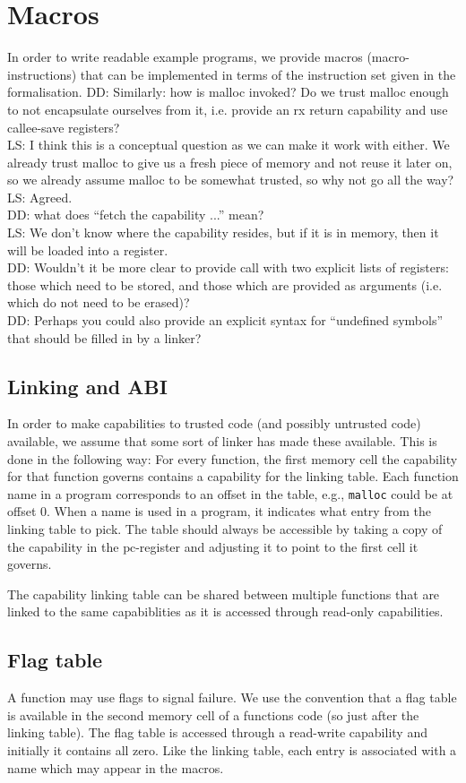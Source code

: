 \documentclass[a4paper]{article}
\newcommand\lau[1]{{\color{purple} \sf \footnotesize {LS: #1}}\\}
\newcommand\dominique[1]{{\color{purple} \sf \footnotesize {DD: #1}}\\}
\newcommand{\pcreg}{\mathrm{pc}}
\begin{document}
\section{Macros}
In order to write readable example programs, we provide macros (macro-instructions) that can be implemented in terms of the instruction set given in the formalisation.
\dominique{Similarly: how is malloc invoked?  Do we trust malloc enough to not encapsulate ourselves from it, i.e. provide an rx return capability and use callee-save registers?}
\lau{ I think this is a conceptual question as we can make it work with either. We already trust malloc to give us a fresh piece of memory and not reuse it later on, so we already assume malloc to be somewhat trusted, so why not go all the way? }
\lau{Agreed.}

\dominique{what does ``fetch the capability ...'' mean?}
\lau{ We don't know where the capability resides, but if it is in memory, then it will be loaded into a register. }
\dominique{Wouldn't it be more clear to provide call with two explicit lists of registers: those which need to be stored, and those which are provided as arguments (i.e. which do not need to be erased)?}
\dominique{Perhaps you could also provide an explicit syntax for ``undefined symbols'' that should be filled in by a linker?}

\subsection{Linking and ABI}
In order to make capabilities to trusted code (and possibly untrusted code) available, we assume that some sort of linker has made these available. This is done in the following way: For every function, the first memory cell the capability for that function governs contains a capability for the linking table. Each function name in a program corresponds to an offset in the table, e.g., \texttt{malloc} could be at offset 0. When a name is used in a program, it indicates what entry from the linking table to pick. The table should always be accessible by taking a copy of the capability in the $\pcreg$-register and adjusting it to point to the first cell it governs.

The capability linking table can be shared between multiple functions that are linked to the same capabiblities as it is accessed through read-only capabilities.

\subsection{Flag table}
A function may use flags to signal failure. We use the convention that a flag table is available in the second memory cell of a functions code (so just after the linking table). The flag table is accessed through a read-write capability and initially it contains all zero. Like the linking table, each entry is associated with a name which may appear in the macros.
\end{document}

